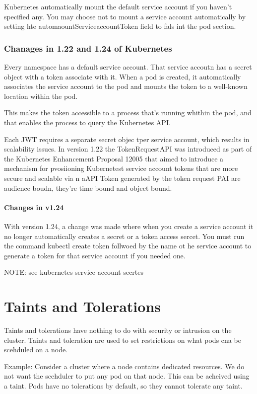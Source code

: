 \documentclass[11pt]{book}
\begin{document}
    Kubernetes automatically mount the default service account if you haven't specified any.
    You may choose not to mount a service account automatically by setting hte automaountServiceaccountToken field to fals int the pod section.

    \subsubsection{Chanages in 1.22 and 1.24 of Kubernetes}
    Every namespace has a default service account.
    That service accoutn has a secret object with a token associate with it.
    When a pod is created, it automatically associates the service account to the pod and mounts the token to a well-known location within the pod.

    This makes the token accessible to a process that's running whithin the pod, and that enables the process to query the Kubernetes API.

    Each JWT requires a separate secret objec tper service account, which results in scalability issues.
    In version 1.22 the TokenRequestAPI was introduced as part of the Kubernetes Enhancement Proposal 12005 that aimed to introduce a mechanism for pvosiioning Kubernetest service account tokens that are more secure and scalable via n aAPI
    Token generated by the token request PAI are audience boudn, they're time bound and object bound.

    \paragraph{Changes in v1.24}
    With version 1.24, a change was made where when you create a service account it no longer automatically creates a secret or a token access sercet.
    You must run the command kubectl create token follwoed by the name ot he service account to generate a token for that service account if you needed one.

    NOTE: see kubernetes service account secrtes


    \section{Taints and Tolerations}

    Taints and tolerations have nothing to do with security or intrusion on the cluster.
    Taints and toleration are used to set restrictions on what pods cna be scehduled on a node.

    Example:
    Consider a cluster where a node contains dedicated resources.
    We do not want the scehduler to put any pod on that node.
    This can be acheived using a taint.
    Pods have no tolerations by default, so they cannot tolerate any taint.
\end{document}
